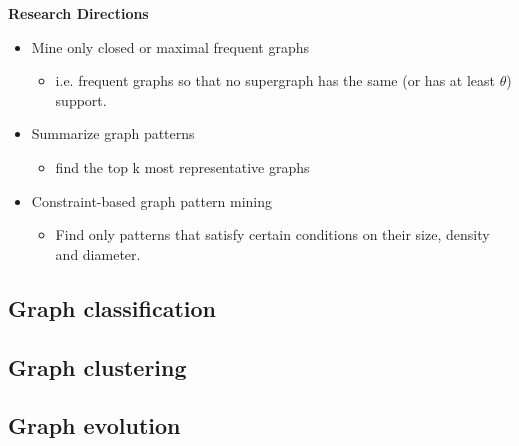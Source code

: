 \documentclass[../notes.tex]{subfiles}
\begin{document}
\textbf{Research Directions}
\begin{itemize}
  \item Mine only closed or maximal frequent graphs
  \begin{itemize}
    \item i.e. frequent graphs so that no supergraph has the same (or has at least $\theta$) support.
  \end{itemize}

  \item Summarize graph patterns
  \begin{itemize}
    \item find the top k most representative graphs
  \end{itemize}

  \item Constraint-based graph pattern mining
  \begin{itemize}
    \item Find only patterns that satisfy certain conditions on their size, density and diameter. 
  \end{itemize}
\end{itemize}

\subsection{Graph classification}

\subsection{Graph clustering}

\subsection{Graph evolution}
\end{document}
